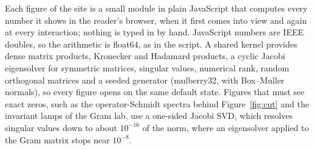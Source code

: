 Each figure of the site is a small module in plain JavaScript that computes every number it shows in the reader's
browser, when it first comes into view and again at every interaction; nothing is typed in by hand. JavaScript numbers
are IEEE doubles, so the arithmetic is float64, as in the script. A shared kernel provides dense matrix products,
Kronecker and Hadamard products, a cyclic Jacobi eigensolver for symmetric matrices, singular values, numerical rank,
random orthogonal matrices and a seeded generator (mulberry32, with Box--Muller normals), so every figure opens on the
same default state. Figures that must see exact zeros, such as the operator-Schmidt spectra behind Figure~\ref{fig:cut}
and the invariant lamps of the Gram lab, use a one-sided Jacobi SVD, which resolves singular values down to about
$10^{-16}$ of the norm, where an eigensolver applied to the Gram matrix stops near $10^{-8}$.
